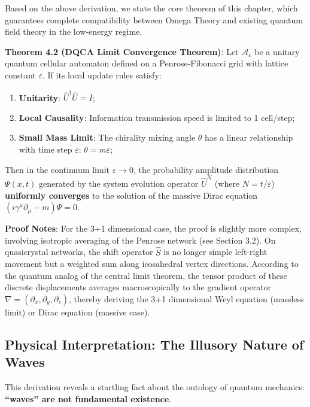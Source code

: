Based on the above derivation, we state the core theorem of this chapter, which guarantees complete compatibility between Omega Theory and existing quantum field theory in the low-energy regime.

\textbf{Theorem 4.2 (DQCA Limit Convergence Theorem)}:
Let $\mathcal{A}_\varepsilon$ be a unitary quantum cellular automaton defined on a Penrose-Fibonacci grid with lattice constant $\varepsilon$. If its local update rules satisfy:

\begin{enumerate}
\item \textbf{Unitarity}: $\hat{U}^\dagger \hat{U} = I$;
\item \textbf{Local Causality}: Information transmission speed is limited to 1 cell/step;
\item \textbf{Small Mass Limit}: The chirality mixing angle $\theta$ has a linear relationship with time step $\varepsilon$: $\theta = m \varepsilon$;
\end{enumerate}

Then in the continuum limit $\varepsilon \to 0$, the probability amplitude distribution $\Psi(x,t)$ generated by the system evolution operator $\hat{U}^N$ (where $N = t/\varepsilon$) \textbf{uniformly converges} to the solution of the massive Dirac equation $(i \gamma^\mu \partial_\mu - m)\Psi = 0$.

\textbf{Proof Notes}:
For the 3+1 dimensional case, the proof is slightly more complex, involving isotropic averaging of the Penrose network (see Section 3.2). On quasicrystal networks, the shift operator $\hat{S}$ is no longer simple left-right movement but a weighted sum along icosahedral vertex directions. According to the quantum analog of the central limit theorem, the tensor product of these discrete displacements averages macroscopically to the gradient operator $\nabla = (\partial_x, \partial_y, \partial_z)$, thereby deriving the 3+1 dimensional Weyl equation (massless limit) or Dirac equation (massive case).

\subsection{Physical Interpretation: The Illusory Nature of Waves}

This derivation reveals a startling fact about the ontology of quantum mechanics: \textbf{``waves'' are not fundamental existence}.

